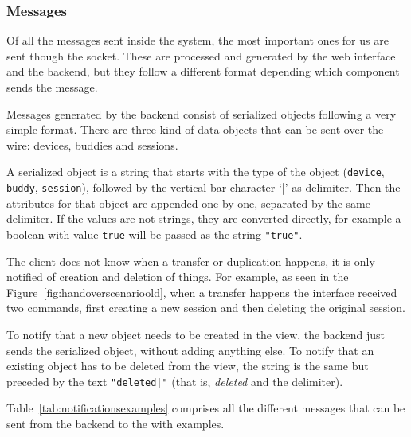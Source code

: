 
\subsubsection{Messages} %
\label{ssub:messagesold}

Of all the messages sent inside the system, the most important ones for us are sent though the  socket.
These are processed and generated by the web interface and the  backend, but they follow a different format depending which component sends the message.

Messages generated by the backend consist of serialized objects following a very simple format.
There are three kind of data objects that can be sent over the wire: devices, buddies and sessions.

A serialized object is a string that starts with the type of the object (\texttt{device}, \texttt{buddy}, \texttt{session}), followed by the vertical bar character `|' as delimiter.
Then the attributes for that object are appended one by one, separated by the same delimiter.
If the values are not strings, they are converted directly, for example a boolean with value \texttt{true} will be passed as the string \texttt{"true"}.

The client does not know when a transfer or duplication happens, it is only notified of creation and deletion of things.
For example, as seen in the Figure~\ref{fig:handoverscenarioold}, when a transfer happens the interface received two commands, first creating a new session and then deleting the original session.

To notify that a new object needs to be created in the view, the backend just sends the serialized object, without adding anything else.
To notify that an existing object has to be deleted from the view, the string is the same but preceded by the text \texttt{"deleted|"} (that is, \emph{deleted} and the delimiter).

Table~\ref{tab:notificationsexamples} comprises all the different messages that can be sent from the  backend to the  with examples.

